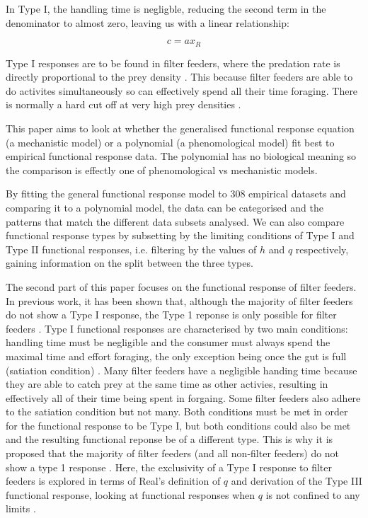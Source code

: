 \documentclass[11pt, a4paper, titlepage]{article}
\begin{document}
 In Type I, the handling time is negligble, reducing the second term in the denominator to almost zero, leaving us with a linear relationship:

\begin{equation}
c = ax_R
\end{equation}

Type I responses are to be found in filter feeders, where the predation rate is directly  proportional to the prey density \parencite{Jeschke2004}. This because filter feeders are able to do activites simultaneously so can effectively spend all their time foraging. There is normally a hard cut off at very high prey densities \parencite{Jeschke2004}. 

This paper aims to look at whether the generalised functional response equation (a mechanistic model) or a polynomial (a phenomological model) fit best to empirical functional response data. The polynomial has no biological meaning so the comparison is effectly one of phenomological vs mechanistic models. 

By fitting the general functional response model to 308 empirical datasets and comparing it to a polynomial model, the data can be categorised and the patterns that match the different data subsets analysed. We can also compare functional response types by subsetting by the limiting conditions of Type I and Type II functional responses, i.e. filtering by the values of $h$ and $q$ respectively, gaining information on the split between the three types.

The second part of this paper focuses on the functional response of  filter feeders. In previous work, it has been shown that, although the majority of filter feeders do not show a Type I response, the Type 1 reponse is only possible for filter feeders \parencite{Jeschke2004}.  Type I functional responses are characterised by two main conditions: handling time must be negligible and the consumer must always spend the maximal time and effort foraging, the only exception being once the gut is full (satiation condition) \parencite{Jeschke2002}. Many filter feeders have a negligible handing time because they are able to catch prey at the same time as other activies, resulting in effectively all of their time being spent in forgaing. Some filter feeders also adhere to the satiation condition but not many. Both conditions must be met in order for the functional response to be Type I, but both conditions could also be met and the resulting functional reponse be of a different type. This is why it is proposed that the majority of filter feeders (and all non-filter feeders) do not show a type 1 response \parencite{Jeschke2004, Deville2013, Porter1983}. Here, the exclusivity of a Type I response to filter feeders is explored in terms of Real's definition of $q$ and derivation of the Type III functional response, looking at functional responses when $q$ is not confined to any limits \parencite{Real1977}.
\end{document}
